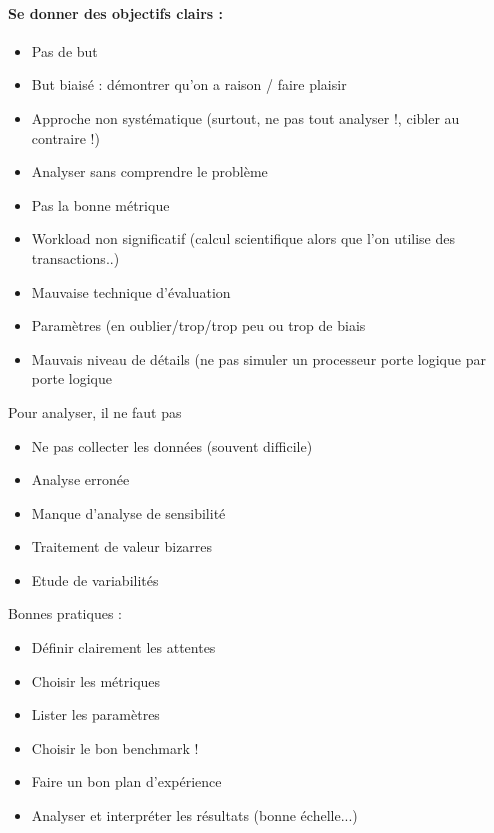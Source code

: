 \documentclass{article}
\begin{document}
\paragraph{Se donner des objectifs clairs :}
\begin{itemize}
\item Pas de but
\item But biaisé : démontrer qu'on a raison / faire plaisir
\item Approche non systématique (surtout, ne pas tout analyser !, cibler au contraire !)
\item Analyser sans comprendre le problème
\item Pas la bonne métrique
\item Workload non significatif (calcul scientifique alors que l'on utilise des transactions..)
\item Mauvaise technique d'évaluation
\item Paramètres (en oublier/trop/trop peu ou trop de biais
\item Mauvais niveau de détails (ne pas simuler un processeur porte logique par porte logique
\end{itemize}

Pour analyser, il ne faut pas
\begin{itemize}
\item Ne pas collecter les données (souvent difficile)
\item Analyse erronée
\item Manque d'analyse de sensibilité
\item Traitement de valeur bizarres
\item Etude de variabilités
\end{itemize}

Bonnes pratiques :
\begin{itemize}
\item Définir clairement les attentes
\item Choisir les métriques
\item Lister les paramètres
\item Choisir le bon benchmark !
\item Faire un bon plan d'expérience
\item Analyser et interpréter les résultats (bonne échelle...)
\end{itemize}
\end{document}

